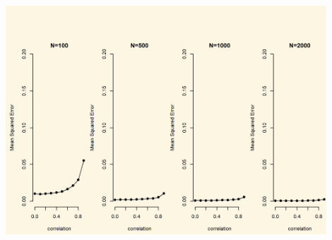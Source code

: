\documentclass[]{article}
\begin{document}
\includegraphics[width=0.9\textwidth,height=\textheight]{./img/unnamed-chunk-178-1.png}
\end{document}
